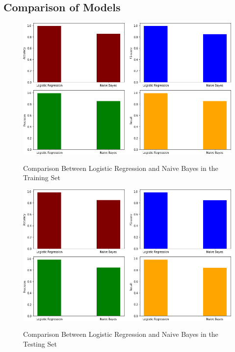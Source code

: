 \documentclass[runningheads]{llncs}
\begin{document}
\subsection{Comparison of Models}


\begin{figure}[!htb]           	 
\centering               	 
\caption{Comparison Between Logistic Regression and Naive Bayes in the Training Set} \vspace{0.5em}
\includegraphics[scale=2]{datavis-train.png}  	 
\label{fig:datavis_train}
\end{figure}


\begin{figure}[!htb]           	 
\centering          	 
\caption{Comparison Between Logistic Regression and Naive Bayes in the Testing Set} \vspace{0.5em}
\includegraphics[scale=2]{datavis-test.png}  	 
\label{fig:datavis_test}
\end{figure}
\end{document}
